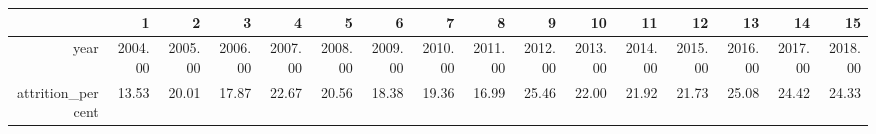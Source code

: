 \begin{table}[ht]
\centering
\begin{tabular}{rrrrrrrrrrrrrrrr}
  \hline
 & 1 & 2 & 3 & 4 & 5 & 6 & 7 & 8 & 9 & 10 & 11 & 12 & 13 & 14 & 15 \\ 
  \hline
year & 2004.00 & 2005.00 & 2006.00 & 2007.00 & 2008.00 & 2009.00 & 2010.00 & 2011.00 & 2012.00 & 2013.00 & 2014.00 & 2015.00 & 2016.00 & 2017.00 & 2018.00 \\ 
  attrition\_percent & 13.53 & 20.01 & 17.87 & 22.67 & 20.56 & 18.38 & 19.36 & 16.99 & 25.46 & 22.00 & 21.92 & 21.73 & 25.08 & 24.42 & 24.33 \\ 
   \hline
\end{tabular}
\end{table}
